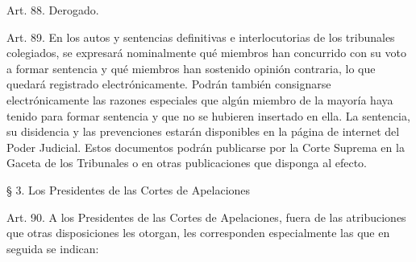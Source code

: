     Art. 88. Derogado.



    Art. 89. En los autos y sentencias definitivas e interlocutorias de los tribunales colegiados, se expresará nominalmente qué miembros han concurrido con su voto a formar sentencia y qué miembros han sostenido opinión contraria, lo que quedará registrado electrónicamente.
    Podrán también consignarse electrónicamente las razones especiales que algún miembro de la mayoría haya tenido para formar sentencia y que no se hubieren insertado en ella.
    La sentencia, su disidencia y las prevenciones estarán disponibles en la página de internet del Poder Judicial. Estos documentos podrán publicarse por la Corte Suprema en la Gaceta de los Tribunales o en otras publicaciones que disponga al efecto.



    § 3. Los Presidentes de las Cortes de Apelaciones


    Art. 90. A los Presidentes de las Cortes de Apelaciones, fuera de las atribuciones que otras disposiciones les otorgan, les corresponden especialmente las que en seguida se indican:

